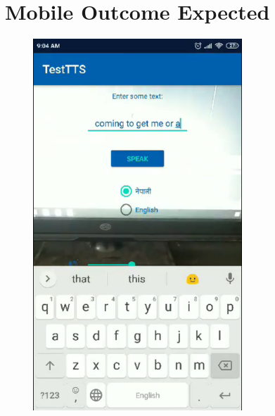         \section{Mobile Outcome Expected}
                \begin{figure}[h]
                        \includegraphics[width=0.7\textwidth]{img/vv-mockup_720.png}
                \end{figure}